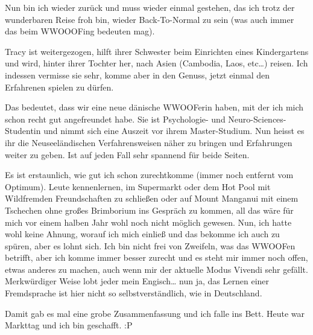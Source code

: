 Nun bin ich wieder zurück und muss wieder einmal gestehen, das ich trotz
der wunderbaren Reise froh bin, wieder Back-To-Normal zu sein (was auch
immer das beim WWOOOFing bedeuten mag).

Tracy ist weitergezogen, hilft ihrer Schwester beim Einrichten eines
Kindergartens und wird, hinter ihrer Tochter her, nach Asien (Cambodia,
Laos, etc\ldots) reisen. Ich indessen vermisse sie sehr, komme aber in
den Genuss, jetzt einmal den Erfahrenen spielen zu dürfen.

Das bedeutet, dass wir eine neue dänische WWOOFerin haben, mit der ich
mich schon recht gut angefreundet habe. Sie ist Psychologie- und
Neuro-Sciences-Studentin und nimmt sich eine Auszeit vor ihrem
Master-Studium. Nun heisst es ihr die Neuseeländischen Verfahrensweisen
näher zu bringen und Erfahrungen weiter zu geben. Ist auf jeden Fall
sehr spannend für beide Seiten.

Es ist erstaunlich, wie gut ich schon zurechtkomme (immer noch
entfernt vom Optimum). Leute kennenlernen, im Supermarkt oder dem Hot
Pool mit Wildfremden Freundschaften zu schließen oder auf Mount
Manganui mit einem Tschechen ohne großes Brimborium ins Gespräch zu
kommen, all das wäre für mich vor einem halben Jahr wohl noch nicht
möglich gewesen. Nun, ich hatte wohl keine Ahnung, worauf ich mich
einließ und das bekomme ich auch zu spüren, aber es lohnt sich. Ich
bin nicht frei von Zweifeln, was das WWOOFen betrifft, aber ich komme
immer besser zurecht und es steht mir immer noch offen, etwas anderes
zu machen, auch wenn mir der aktuelle Modus Vivendi sehr gefällt.
Merkwürdiger Weise lobt jeder mein Engisch\ldots{} nun ja, das Lernen
einer Fremdsprache ist hier nicht so selbstverständlich, wie in
Deutschland.

Damit gab es mal eine grobe Zusammenfassung und ich falle ins Bett.
Heute war Markttag und ich bin geschafft. :P
